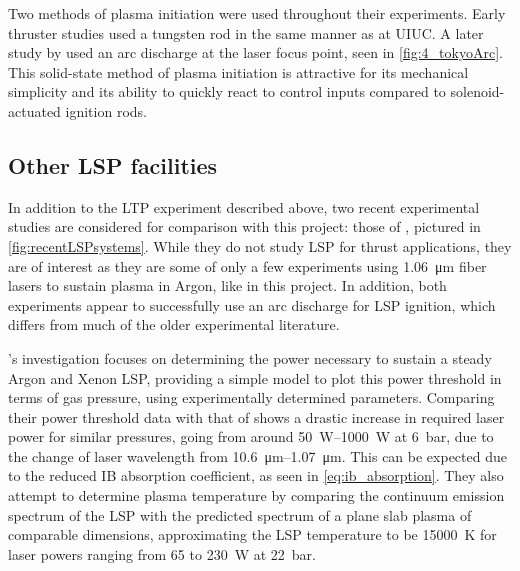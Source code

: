            Two methods of plasma initiation were used throughout their experiments. Early thruster studies used a tungsten rod in the same manner as \textcite{schwartzLasersustainedGasPlasmas1989} at UIUC. A later study by \textcite{matsuiGeneratingConditionsArgon2019} used an arc discharge at the laser focus point, seen in \autoref{fig:4_tokyoArc}. This solid-state method of plasma initiation is attractive for its mechanical simplicity and its ability to quickly react to control inputs compared to solenoid-actuated ignition rods.

        \subsection{Other LSP facilities}
            In addition to the LTP experiment described above, two recent experimental studies are considered for comparison with this project: those of \textcite{zimakovInteractionNearIRLaser2016,luCharacteristicDiagnosticsLaserStabilized2022}, pictured in \autoref{fig:recentLSPsystems}. While they do not study LSP for thrust applications, they are of interest as they are some of only a few experiments using \qty{1.06}{\um} fiber lasers to sustain plasma in Argon, like in this project. In addition, both experiments appear to successfully use an arc discharge for LSP ignition, which differs from much of the older experimental literature.

            \textcite{zimakovInteractionNearIRLaser2016}'s investigation focuses on determining the power necessary to sustain a steady Argon and Xenon LSP, providing a simple model to plot this power threshold in terms of gas pressure, using experimentally determined parameters. Comparing their power threshold data with that of \textcite{moodyMaintenanceGasBreakdown1975} shows a drastic increase in required laser power for similar pressures, going from around \qtyrange{50}{1000}{W} at \qty{6}{bar}, due to the change of laser wavelength from \qtyrange{10.6}{1.07}{\um}. This can be expected due to the reduced IB absorption coefficient, as seen in \autoref{eq:ib_absorption}. They also attempt to determine plasma temperature by comparing the continuum emission spectrum of the LSP with the predicted spectrum of a plane slab plasma of comparable dimensions, approximating the LSP temperature to be \qty{15000}{K} for laser powers ranging from 65 to \qty{230}{W} at \qty{22}{bar}.
            
